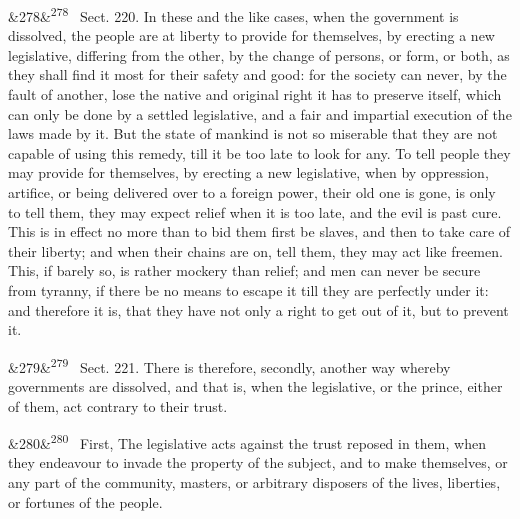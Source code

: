 \documentclass[12pt]{article}
\newcommand{\para}[1][]{\par\noindent\ifx&#1&\else\textsuperscript{\footnotesize #1}~\fi}
\begin{document}
\para[278] Sect. 220. In these and the like cases, when the government is dissolved, the people are at liberty to provide for themselves, by erecting a new legislative, differing from the other, by the change of persons, or form, or both, as they shall find it most for their safety and good: for the society can never, by the fault of another, lose the native and original right it has to preserve itself, which can only be done by a settled legislative, and a fair and impartial execution of the laws made by it. But the state of mankind is not so miserable that they are not capable of using this remedy, till it be too late to look for any. To tell people they may provide for themselves, by erecting a new legislative, when by oppression, artifice, or being delivered over to a foreign power, their old one is gone, is only to tell them, they may expect relief when it is too late, and the evil is past cure. This is in effect no more than to bid them first be slaves, and then to take care of their liberty; and when their chains are on, tell them, they may act like freemen. This, if barely so, is rather mockery than relief; and men can never be secure from tyranny, if there be no means to escape it till they are perfectly under it: and therefore it is, that they have not only a right to get out of it, but to prevent it.

\para[279] Sect. 221. There is therefore, secondly, another way whereby governments are dissolved, and that is, when the legislative, or the prince, either of them, act contrary to their trust.

\para[280] First, The legislative acts against the trust reposed in them, when they endeavour to invade the property of the subject, and to make themselves, or any part of the community, masters, or arbitrary disposers of the lives, liberties, or fortunes of the people.
\end{document}
